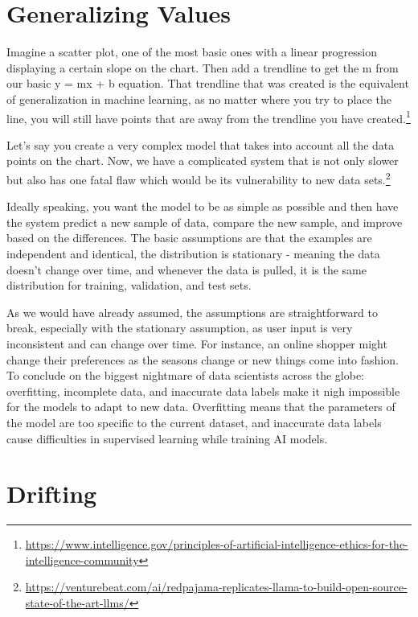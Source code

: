 \documentclass[
]{book}
\begin{document}
\hypertarget{generalizing-values}{%
\section{Generalizing Values}\label{generalizing-values}}

Imagine a scatter plot, one of the most basic ones with a linear progression displaying a certain slope on the chart. Then add a trendline to get the m from our basic y = mx + b equation. That trendline that was created is the equivalent of generalization in machine learning, as no matter where you try to place the line, you will still have points that are away from the trendline you have created.\footnote{\url{https://www.intelligence.gov/principles-of-artificial-intelligence-ethics-for-the-intelligence-community}}

Let's say you create a very complex model that takes into account all the data points on the chart. Now, we have a complicated system that is not only slower but also has one fatal flaw which would be its vulnerability to new data sets.\footnote{\url{https://venturebeat.com/ai/redpajama-replicates-llama-to-build-open-source-state-of-the-art-llms/}}

Ideally speaking, you want the model to be as simple as possible and then have the system predict a new sample of data, compare the new sample, and improve based on the differences. The basic assumptions are that the examples are independent and identical, the distribution is stationary - meaning the data doesn't change over time, and whenever the data is pulled, it is the same distribution for training, validation, and test sets.

As we would have already assumed, the assumptions are straightforward to break, especially with the stationary assumption, as user input is very inconsistent and can change over time. For instance, an online shopper might change their preferences as the seasons change or new things come into fashion.
To conclude on the biggest nightmare of data scientists across the globe: overfitting, incomplete data, and inaccurate data labels make it nigh impossible for the models to adapt to new data. Overfitting means that the parameters of the model are too specific to the current dataset, and inaccurate data labels cause difficulties in supervised learning while training AI models.

\hypertarget{drifting}{%
\section{Drifting}\label{drifting}}
\end{document}
